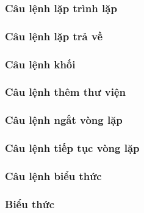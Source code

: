 {\subsubsection{Câu lệnh lặp trình lặp}
\label{ap1:stmtfor}

\subsubsection{Câu lệnh lặp trả về}
\label{ap1:stmtyeet}


\subsubsection{Câu lệnh khối}
\label{ap1:stmtblock}

\subsubsection{Câu lệnh thêm thư viện}
\label{ap1:stmtadd}

\subsubsection{Câu lệnh ngắt vòng lặp}
\label{ap1:stmtbr}

\subsubsection{Câu lệnh tiếp tục vòng lặp}
\label{ap1:stmtskip}

\subsubsection{Câu lệnh biểu thức}
\label{ap1:stmtexpr}

\subsubsection{Biểu thức}
\label{ap1:expr}

}